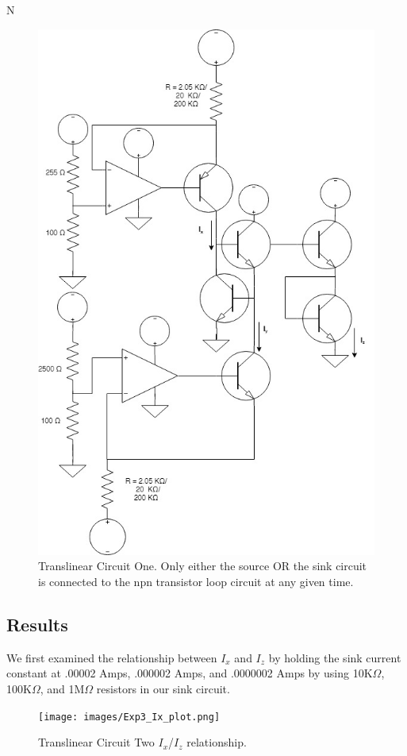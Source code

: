 N\documentclass{article}
\begin{document}
\begin{figure}[H]   
  \centering
  \includegraphics[scale = 0.5]{images/experiment_two_schematic.jpg}
  \caption{Translinear Circuit One. Only either the source OR the sink circuit is connected to the npn transistor loop circuit at any given time.}  
  \label{fig:exp2_sch}
\end{figure}

\subsection{Results}
We first examined the relationship between $I_x$ and $I_z$ by holding the sink current constant at .00002 Amps, .000002 Amps, and .0000002 Amps by using 10K$\Omega$, 100K$\Omega$, and 1M$\Omega$ resistors in our sink circuit. 
\begin{figure}[H]
  \centering        
  \texttt{[image: images/Exp3\_Ix\_plot.png]}
  \caption{Translinear Circuit Two $I_x$/$I_z$ relationship.} 
  \label{fig:exp2_ixiz}
\end{figure}
\end{document}
